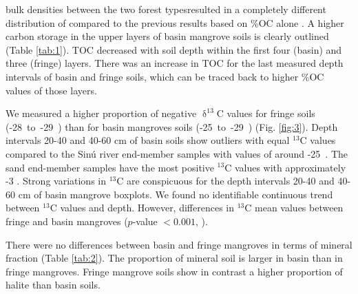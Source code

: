 \DIFdelbegin {}\DIFdelend \DIFaddbegin {}\DIFaddend bulk densities between the two forest types\DIFaddbegin {}\DIFaddend resulted in a completely different distribution of \DIFdelbegin {}\DIFdelend \DIFaddbegin {}\DIFaddend compared to the previous results based on \%OC alone \DIFaddbegin {}\DIFaddend . A higher carbon storage in the upper layers of basin mangrove soils is clearly outlined (Table \ref{tab:1}). \DIFdelbegin {}\DIFdelend \DIFaddbegin {}\DIFaddend TOC decreased with soil depth within the first four (basin) and three (fringe) layers. There was an increase in TOC for the last measured depth intervals of basin and fringe soils, which can be traced back to higher \%OC values of those layers.

We measured a higher proportion of negative $\updelta^{13}$C values for fringe soils \mbox{(-28 to -29 \permil)} than for basin mangroves soils \mbox{(-25 to -29 \permil)} (Fig. \ref{fig:3}).  Depth intervals 20-40 and 40-60 cm of basin soils show outliers with equal $^{13}$C values compared to the Sin\'{u} river end-member samples with values of around \mbox{-25 \permil}. The sand end-member samples have the most positive $^{13}$C values with approximately -3 \permil.  Strong variations in $^{13}$C are conspicuous for the depth intervals 20-40 and 40-60 cm of basin mangrove boxplots. We found no identifiable continuous trend between $^{13}$C values and depth. However, differences in $^{13}$C mean values between fringe and basin mangroves \DIFdelbegin {}\DIFdelend \DIFaddbegin {}\DIFaddend ($p$-value $< 0.001$, \DIFdelbegin {}\DIFdelend \DIFaddbegin {}\DIFaddend ). 


There were no differences between basin and fringe mangroves in terms of \DIFdelbegin {}\DIFdelend \DIFaddbegin {}\DIFaddend mineral fraction (Table \ref{tab:2}). The proportion of mineral soil is larger in basin than in fringe mangroves. Fringe mangrove soils show in contrast a higher proportion of halite than basin soils.

